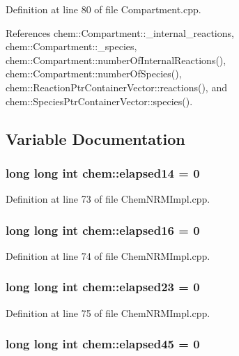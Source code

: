 Definition at line 80 of file Compartment.\-cpp.



References chem\-::\-Compartment\-::\-\_\-internal\-\_\-reactions, chem\-::\-Compartment\-::\-\_\-species, chem\-::\-Compartment\-::number\-Of\-Internal\-Reactions(), chem\-::\-Compartment\-::number\-Of\-Species(), chem\-::\-Reaction\-Ptr\-Container\-Vector\-::reactions(), and chem\-::\-Species\-Ptr\-Container\-Vector\-::species().



\subsection{Variable Documentation}
\hypertarget{namespacechem_ac389831014b55592c5e49626f448b287}{
\subsubsection[{elapsed14}]{\setlength{\rightskip}{0pt plus 5cm}long long int {\bf chem\-::elapsed14} = 0}}\label{namespacechem_ac389831014b55592c5e49626f448b287}


Definition at line 73 of file Chem\-N\-R\-M\-Impl.\-cpp.

\hypertarget{namespacechem_a62660120694a02fc2e5d6f8aef254a00}{
\subsubsection[{elapsed16}]{\setlength{\rightskip}{0pt plus 5cm}long long int {\bf chem\-::elapsed16} = 0}}\label{namespacechem_a62660120694a02fc2e5d6f8aef254a00}


Definition at line 74 of file Chem\-N\-R\-M\-Impl.\-cpp.

\hypertarget{namespacechem_a0197cd49bd8ebf45cab3710c9022c08d}{
\subsubsection[{elapsed23}]{\setlength{\rightskip}{0pt plus 5cm}long long int {\bf chem\-::elapsed23} = 0}}\label{namespacechem_a0197cd49bd8ebf45cab3710c9022c08d}


Definition at line 75 of file Chem\-N\-R\-M\-Impl.\-cpp.

\hypertarget{namespacechem_ac3fe333a7580df824dc4f7e827a05528}{
\subsubsection[{elapsed45}]{\setlength{\rightskip}{0pt plus 5cm}long long int {\bf chem\-::elapsed45} = 0}}\label{namespacechem_ac3fe333a7580df824dc4f7e827a05528}


